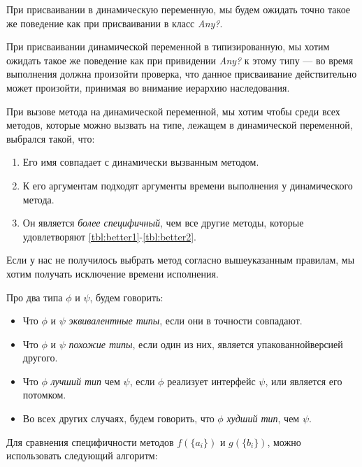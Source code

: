 При присваивании в динамическую переменную, мы будем ожидать точно такое же поведение как при присваивании в класс \textit{Any?}.

При присваивании динамической переменной в типизированную, мы хотим ожидать такое же поведение как при привидении \textit{Any?} к этому типу --- во время выполнения должна произойти проверка, что данное присваивание действительно может произойти, принимая во внимание иерархию наследования.

При вызове метода на динамической переменной, мы хотим чтобы среди всех методов,  которые можно вызвать на типе, лежащем в динамической переменной, выбрался такой, что:
\begin{enumerate}
    \item Его имя совпадает с динамически вызванным методом. \label{tbl:better1}
    \item К его аргументам подходят аргументы времени выполнения у динамического метода. \label{tbl:better2}
    \item Он является \textit{более специфичный}, чем все другие методы, которые удовлетворяют \ref{tbl:better1}-\ref{tbl:better2}.
\end{enumerate}

Если у нас не получилось выбрать метод согласно вышеуказанным правилам, мы хотим получать исключение времени исполнения.

Про два типа $\phi$ и $\psi$, будем говорить:
\begin{itemize}
    \item Что $\phi$ и $\psi$ \textit{эквивалентные типы}, если они в точности совпадают.
    \item Что $\phi$ и $\psi$ \textit{похожие типы}, если один из них, является упакованной\footnotemark версией другого.
    \item Что $\phi$ \textit{лучший тип} чем  $\psi$, если $\phi$ реализует интерфейс $\psi$, или является его потомком.
    \item Во всех других случаях, будем говорить, что $\phi$ \textit{худший тип}, чем $\psi$.
\end{itemize}


Для сравнения специфичности методов $f(\{a_i\})$ и $g(\{b_i\})$, можно использовать следующий алгоритм:

